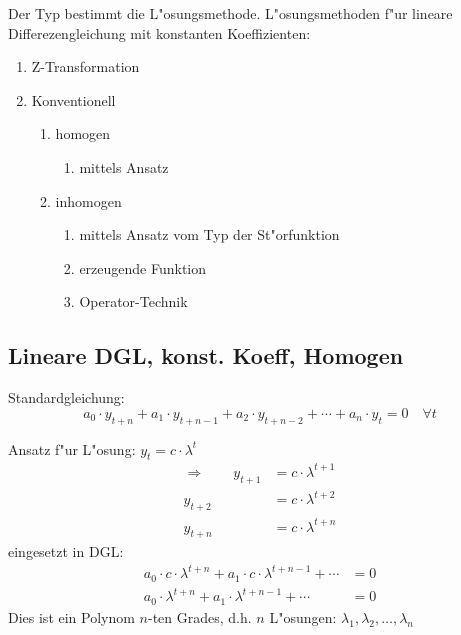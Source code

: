\noindent Der Typ bestimmt die L"osungsmethode. L"osungsmethoden f"ur lineare Differezengleichung mit konstanten Koeffizienten:
\begin{enumerate}
	\item Z-Transformation
	\item Konventionell \begin{enumerate}
			\item homogen \begin{enumerate}
				\item mittels Ansatz
				\end{enumerate}
			\item inhomogen \begin{enumerate}
				\item mittels Ansatz vom Typ der St"orfunktion
				\item erzeugende Funktion
				\item Operator-Technik
				\end{enumerate}
		\end{enumerate}
\end{enumerate}

\subsection{Lineare DGL, konst. Koeff, Homogen}
Standardgleichung:
\begin{equation}
	a_0\cdot y_{t+n}+a_1\cdot y_{t+n-1}+a_2\cdot y_{t+n-2}+\cdots+a_n\cdot y_t =0\quad\forall t
\end{equation}

\noindent Ansatz f"ur L"osung: $y_t=c\cdot\lambda^t$
\begin{align*}
	\Longrightarrow\qquad
		y_{t+1} &= c\cdot\lambda^{t+1} \\
		y_{t+2} &= c\cdot\lambda^{t+2} \\
		y_{t+n} &= c\cdot\lambda^{t+n}
\end{align*}
\noindent eingesetzt in DGL:
\begin{align*}
	a_0\cdot c\cdot\lambda^{t+n}+a_1\cdot c\cdot\lambda^{t+n-1}+\cdots &= 0 \\
	a_0\cdot\lambda^{t+n}+a_1\cdot\lambda^{t+n-1}+\cdots &= 0
\end{align*}
\noindent Dies ist ein Polynom $n$-ten Grades, d.h. $n$ L"osungen: $\lambda_1,\lambda_2,\ldots,\lambda_n$

